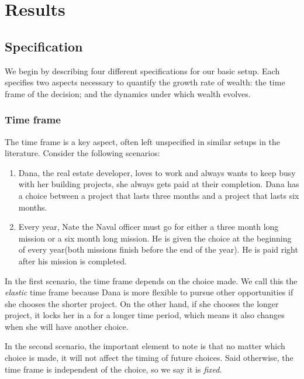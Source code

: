 \documentclass[11pt]{article}
\numberwithin{equation}{section}
\begin{document}
\section{Results}\label{sec:results}

\subsection{Specification}

We begin by describing four different specifications for our basic setup. Each specifies two aspects necessary to quantify the growth rate of wealth: the time frame of the decision; and the dynamics under which wealth evolves.

\subsubsection{Time frame}

The time frame is a key aspect, often left unspecified in similar setups in the literature. Consider the following scenarios:

\begin{enumerate}
    \item Dana, the real estate developer, loves to work and always wants to keep busy with her building projects, she always gets paid at their completion. Dana has a choice between a project that lasts three months and a project that lasts six months. 
    \item Every year, Nate the Naval officer must go for either a three month long mission or a six month long mission. He is given the choice at the beginning of every year(both missions finish before the end of the year). He is paid right after his mission is completed.
\end{enumerate}

In the first scenario, the time frame depends on the choice made. We call this the \textit{elastic} time frame because Dana is more flexible to pursue other opportunities if she chooses the shorter project. On the other hand, if she chooses the longer project, it locks her in a for a longer time period, which means it also changes when she will have another choice.  

In the second scenario, the important element to note is that no matter which choice is made, it will not affect the timing of future choices. Said otherwise, the time frame is independent of the choice, so we say it is \textit{fixed}.
\end{document}
